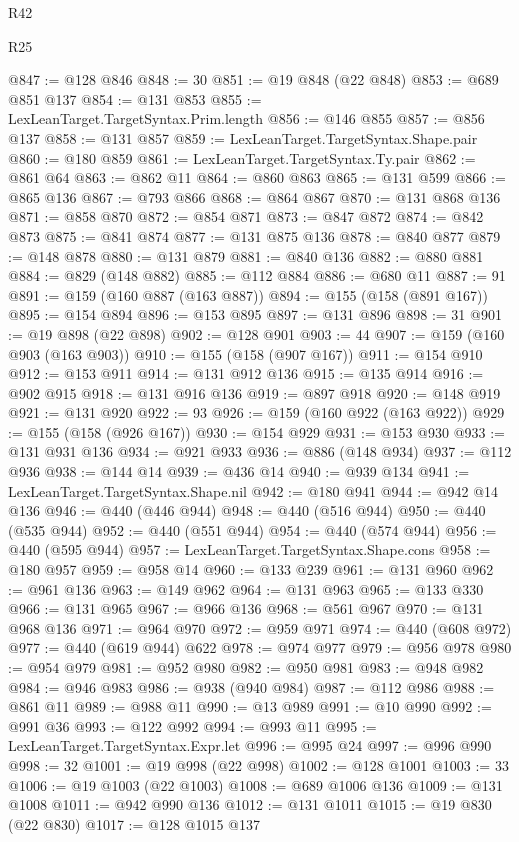 \begin{lexlean}{R42}
\begin{lexlean}{R25}
\begin{coremodule}
{{{{{{{{{{{{{{{{{{{{{{{{{{{{{{{{{{{{{{{{{{{{{{{{{{{{{{{{{{{{{{{{{{{{{{{{{{{{{{{{{{{{{{{{{{{{{{{{{{{{{{{{{{{{{{{{{{{{{{{{{{{{{{{{{{{{{{{{{{{{{{{{{{{{{{{{{{{{{{{{{{{{{{{{{{{{{{{{{{{{{{{{{{{{{{{{{{{{{{{@847 := @128 @846
@848 := 30
@851 := @19 @848 (@22 @848)
@853 := @689 @851 @137
@854 := @131 @853
@855 := LexLeanTarget.TargetSyntax.Prim.length
@856 := @146 @855
@857 := @856 @137
@858 := @131 @857
@859 := LexLeanTarget.TargetSyntax.Shape.pair
@860 := @180 @859
@861 := LexLeanTarget.TargetSyntax.Ty.pair
@862 := @861 @64
@863 := @862 @11
@864 := @860 @863
@865 := @131 @599
@866 := @865 @136
@867 := @793 @866
@868 := @864 @867
@870 := @131 @868 @136
@871 := @858 @870
@872 := @854 @871
@873 := @847 @872
@874 := @842 @873
@875 := @841 @874
@877 := @131 @875 @136
@878 := @840 @877
@879 := @148 @878
@880 := @131 @879
@881 := @840 @136
@882 := @880 @881
@884 := @829 (@148 @882)
@885 := @112 @884
@886 := @680 @11
@887 := 91
@891 := @159 (@160 @887 (@163 @887))
@894 := @155 (@158 (@891 @167))
@895 := @154 @894
@896 := @153 @895
@897 := @131 @896
@898 := 31
@901 := @19 @898 (@22 @898)
@902 := @128 @901
@903 := 44
@907 := @159 (@160 @903 (@163 @903))
@910 := @155 (@158 (@907 @167))
@911 := @154 @910
@912 := @153 @911
@914 := @131 @912 @136
@915 := @135 @914
@916 := @902 @915
@918 := @131 @916 @136
@919 := @897 @918
@920 := @148 @919
@921 := @131 @920
@922 := 93
@926 := @159 (@160 @922 (@163 @922))
@929 := @155 (@158 (@926 @167))
@930 := @154 @929
@931 := @153 @930
@933 := @131 @931 @136
@934 := @921 @933
@936 := @886 (@148 @934)
@937 := @112 @936
@938 := @144 @14
@939 := @436 @14
@940 := @939 @134
@941 := LexLeanTarget.TargetSyntax.Shape.nil
@942 := @180 @941
@944 := @942 @14 @136
@946 := @440 (@446 @944)
@948 := @440 (@516 @944)
@950 := @440 (@535 @944)
@952 := @440 (@551 @944)
@954 := @440 (@574 @944)
@956 := @440 (@595 @944)
@957 := LexLeanTarget.TargetSyntax.Shape.cons
@958 := @180 @957
@959 := @958 @14
@960 := @133 @239
@961 := @131 @960
@962 := @961 @136
@963 := @149 @962
@964 := @131 @963
@965 := @133 @330
@966 := @131 @965
@967 := @966 @136
@968 := @561 @967
@970 := @131 @968 @136
@971 := @964 @970
@972 := @959 @971
@974 := @440 (@608 @972)
@977 := @440 (@619 @944) @622
@978 := @974 @977
@979 := @956 @978
@980 := @954 @979
@981 := @952 @980
@982 := @950 @981
@983 := @948 @982
@984 := @946 @983
@986 := @938 (@940 @984)
@987 := @112 @986
@988 := @861 @11
@989 := @988 @11
@990 := @13 @989
@991 := @10 @990
@992 := @991 @36
@993 := @122 @992
@994 := @993 @11
@995 := LexLeanTarget.TargetSyntax.Expr.let
@996 := @995 @24
@997 := @996 @990
@998 := 32
@1001 := @19 @998 (@22 @998)
@1002 := @128 @1001
@1003 := 33
@1006 := @19 @1003 (@22 @1003)
@1008 := @689 @1006 @136
@1009 := @131 @1008
@1011 := @942 @990 @136
@1012 := @131 @1011
@1015 := @19 @830 (@22 @830)
@1017 := @128 @1015 @137
}}}}}}}}}}}}}}}}}}}}}}}}}}}}}}}}}}}}}}}}}}}}}}}}}}}}}}}}}}}}}}}}}}}}}}}}}}}}}}}}}}}}}}}}}}}}}}}}}}}}}}}}}}}}}}}}}}}}}}}}}}}}}}}}}}}}}}}}}}}}}}}}}}}}}}}}}}}}}}}}}}}}}}}}}}}}}}}}}}}}}}}}}}}}}}}}}}}}}}}
\end{coremodule}
\end{lexlean}
\end{lexlean}
